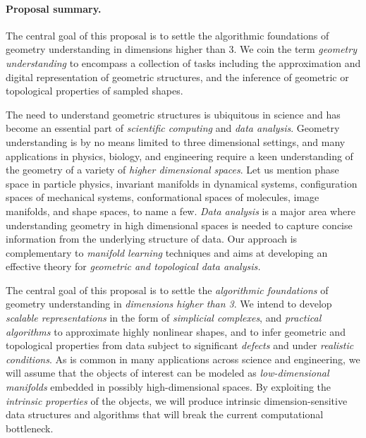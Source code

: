
\paragraph{Proposal summary.} 

The central goal of this proposal is to settle the algorithmic
foundations of geometry understanding in dimensions higher than 3.  We
coin the term {\em geometry understanding} to encompass a collection
of tasks including the approximation and digital representation
of geometric structures, and the inference of geometric or topological
properties of sampled
shapes.  

The need to understand geometric structures is ubiquitous in science
and has become an essential part of {\em scientific computing} and
{\em data analysis}. 
Geometry understanding is by no means limited to
three dimensional settings, and many applications in physics, biology, and
engineering require a keen understanding of the geometry of a variety
of {\em higher dimensional spaces}. Let us mention phase space in particle
physics, invariant manifolds in dynamical systems, configuration
spaces of mechanical systems, conformational spaces of molecules,
image manifolds, and shape spaces, to name a few.  {\em Data
  analysis} is a major area where understanding
geometry in high dimensional spaces is  needed to
 capture concise information from the underlying structure of
 data. Our approach is complementary to {\em manifold learning}
 techniques and aims at  developing an effective theory for {\em geometric and
 topological data analysis.}

The central goal of this proposal is to settle the {\em algorithmic
  foundations} of geometry understanding in {\em dimensions higher
  than 3}.  We intend to develop {\em scalable representations} in the
form of {\em simplicial complexes}, and {\em practical algorithms} to
approximate highly nonlinear shapes, and to infer geometric and
topological properties from data subject to significant {\em defects}
and under {\em realistic conditions}.  As is common in many
applications across science and engineering, we will assume that the
objects of interest can be modeled as {\em low-dimensional manifolds}
embedded in possibly high-dimensional spaces. By exploiting the {\em
  intrinsic properties} of the objects, we will produce intrinsic
dimension-sensitive data structures and algorithms that will break the
current computational bottleneck.

